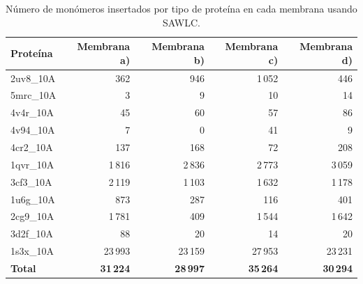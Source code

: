 \begin{table}[h]
\centering
\begin{tabular}{lrrrr}
\toprule
\textbf{Proteína} & \textbf{Membrana a)} & \textbf{Membrana b)} & \textbf{Membrana c)} & \textbf{Membrana d)} \\
\midrule
2uv8\_10A &    362  &    946  & 1\,052 &    446  \\
5mrc\_10A &      3  &      9  &     10 &     14  \\
4v4r\_10A &     45  &     60  &     57 &     86  \\
4v94\_10A &      7  &      0  &     41 &      9  \\
4cr2\_10A &    137  &    168  &     72 &    208  \\
1qvr\_10A &  1\,816 &  2\,836 & 2\,773 &  3\,059 \\
3cf3\_10A &  2\,119 &  1\,103 & 1\,632 &  1\,178 \\
1u6g\_10A &    873  &    287  &    116 &    401  \\
2cg9\_10A &  1\,781 &    409  & 1\,544 &  1\,642 \\
3d2f\_10A &     88  &     20  &     14 &     20  \\
1s3x\_10A & 23\,993 & 23\,159 & 27\,953 & 23\,231 \\
\midrule
\textbf{Total} & \textbf{31\,224} & \textbf{28\,997} & \textbf{35\,264} & \textbf{30\,294} \\
\bottomrule
\end{tabular}
\caption{Número de monómeros insertados por tipo de proteína en cada membrana usando SAWLC.}
\label{tab:monomeros-sawlc}
\end{table}